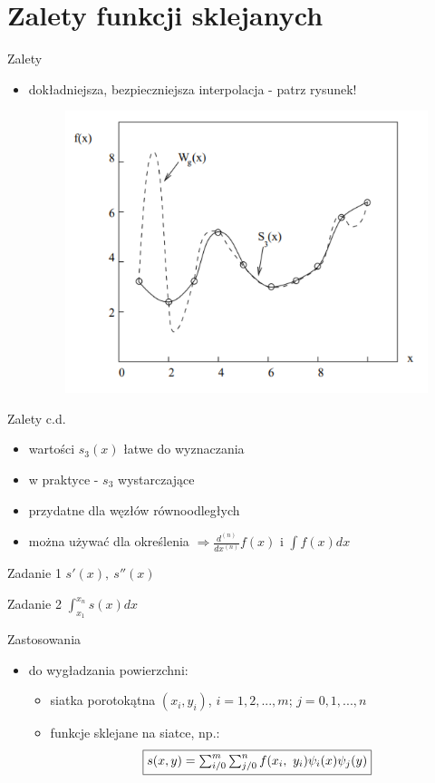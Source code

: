 \section{Zalety funkcji sklejanych}
\begin{frame}{Zalety}
	\begin{itemize}
	\item dokładniejsza, bezpieczniejsza interpolacja - patrz rysunek!
    \begin{figure}[h]
			\includegraphics[width=.75\linewidth]{img/4/spline_img_5}
		\end{figure}
	\end{itemize}
\end{frame}
\begin{frame}{Zalety c.d.}
	\begin{itemize}
		\item wartości $s_{3}(x)$ łatwe do wyznaczania
    	\item w praktyce - $s_{3}$ wystarczające
    	\item przydatne dla węzłów równoodległych
    	\item można używać dla określenia $\Rightarrow \frac{d^{(n)}}	
        	{dx^(n)}f(x)$
    		i $\int f(x)dx$ 
	\end{itemize}
	\begin{block}{Zadanie 1}
        	$s'(x), \ s''(x)$
    \end{block}
    \begin{block}{Zadanie 2}
        	$\int^{x_{n}}_{x_{1}}s(x)dx$
    \end{block}
\end{frame}
\begin{frame}{Zastosowania}
	\begin{itemize}
		\item do wygładzania powierzchni:
        	\begin{itemize}
        		\item siatka porotokątna $(x_{i},y_{i})$, $i=1,2,...,m$; 
                	$j=0,1,...,n$
                \item funkcje sklejane na siatce, np.: 
                \[
                	\framebox{$s(x,y)=\sum_{i/0}^{m}\sum_{j/0}^{n}f(x_{i},
                    \ y_{i})\psi_{i}(x)\psi_{j}(y)$}
                \]
        	\end{itemize}
	\end{itemize}
\end{frame}








